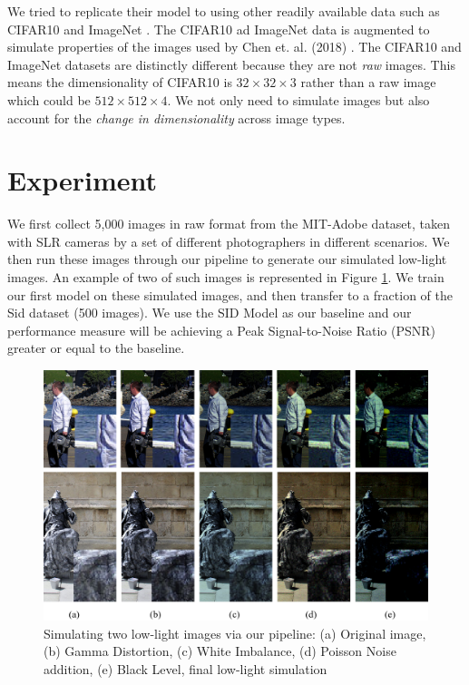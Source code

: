 \documentclass{article}
\begin{document}
We tried to replicate their model to using other readily
available data such as CIFAR10 \cite{cifar10} and ImageNet
\cite{imagenet_cvpr09}. The CIFAR10 ad ImageNet data is augmented to
simulate properties of the images used by Chen et. al. (2018)
\cite{chen2018learning}. The CIFAR10 and ImageNet datasets are distinctly
different because they are not \textit{raw} images. This means the
dimensionality of CIFAR10 is $32 \times 32 \times 3$ rather than a raw
image which could be $512 \times 512 \times 4$. We not only need to
simulate images but also account for the \textit{change in dimensionality}
across image types.



\section{Experiment}

We first collect 5,000 images in raw format from the MIT-Adobe dataset, taken with SLR cameras by a set of different photographers in different scenarios. We then run these images through our pipeline to generate our simulated low-light images. An example of two of such images is represented in
Figure \ref{fig:simulate}. We train our first model on these simulated
images, and then transfer to a fraction of the Sid dataset (500 images). We
use the SID Model as our baseline and our
performance measure will be achieving a Peak Signal-to-Noise Ratio (PSNR)
greater or equal to the baseline.


\begin{figure}[ht]
  \centering
  \includegraphics[scale=0.3]{fig3.png}
  \caption{Simulating two low-light images via our pipeline: (a) Original
    image, (b) Gamma Distortion, (c) White Imbalance, (d) Poisson Noise addition, (e) Black Level, final low-light simulation}
  \label{fig:simulate}
\end{figure}
\end{document}
